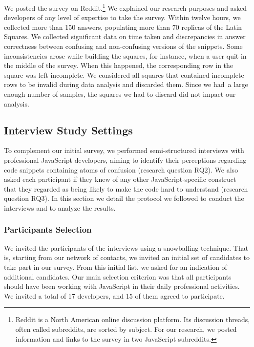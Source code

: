 We posted the survey on Reddit.\footnote{Reddit is a North American online discussion platform.
Its discussion threads, often called subreddits, are sorted by subject. For our research, we posted information and links to the survey in two JavaScript subreddits.} We explained our research purposes and asked developers of any level of expertise to take the survey. Within twelve hours, we collected more than 150 answers, populating more than 70 replicas of the Latin Squares. We collected significant data on time taken and discrepancies in answer correctness between confusing and non-confusing versions of the snippets. Some inconsistencies arose while building the squares, for instance, when a user quit in the middle of the survey. When this happened, the corresponding row in the square was left incomplete. We considered all squares that contained incomplete rows to be invalid during data analysis and discarded them. Since we had\
 a large enough number of samples, the squares we had to discard did not impact our analysis.

 
\subsection{Interview Study Settings}

To complement our initial survey, we performed semi-structured interviews with professional JavaScript developers, aiming to identify their perceptions regarding code snippets containing atoms of confusion (research question RQ2). We also asked each participant if they knew of any other JavaScript-specific construct that they regarded as being likely to make the code hard to understand (research question RQ3). In this section we detail the protocol we followed to conduct the interviews and to analyze the results.


\subsubsection*{Participants Selection} We invited the participants of the interviews using a snowballing technique. That is, starting from our network of contacts, we invited an initial set of candidates to take part in our survey. From this initial list, we asked for an indication of additional candidates. Our main selection criterion was that all participants should have been working with JavaScript in their daily professional activities. We invited a total of 17 developers, and 15 of them agreed to participate.


